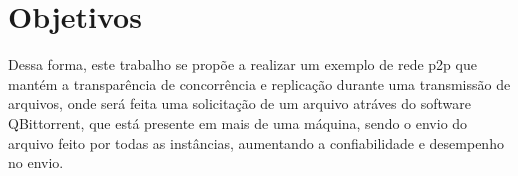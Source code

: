 \chapter{Objetivos}
\label{cap:02}
Dessa forma, este trabalho se propõe a realizar um exemplo de rede \ac{p2p} que mantém a transparência de concorrência e replicação durante uma transmissão de arquivos, onde será feita uma solicitação de um arquivo atráves do software QBittorrent, que está presente em mais de uma máquina, sendo o envio do arquivo feito por todas as instâncias, aumentando a confiabilidade e desempenho no envio.
 